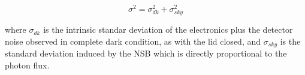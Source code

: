 \begin{equation}
\sigma^2=\sigma^2_{dk}+\sigma^2_{sky}
\end{equation}

\noindent
where $\sigma_{dk}$ is the intrinsic standar deviation of the electronics plus the detector noise observed in complete dark condition, as with the lid closed, and $\sigma_{sky}$ is the standard deviation induced by the  NSB  which is directly proportional to the photon flux.

